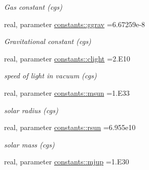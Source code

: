 \begin{DoxyCompactItemize}
\begin{DoxyCompactList}\small\item\em Gas constant (cgs) \end{DoxyCompactList}\item 
\hypertarget{namespaceconstants_a1e2651b5b314d8b869a9a48b1063f126}{}real, parameter \hyperlink{namespaceconstants_a1e2651b5b314d8b869a9a48b1063f126}{constants\+::ggrav} =6.\+67259e-\/8\label{namespaceconstants_a1e2651b5b314d8b869a9a48b1063f126}

\begin{DoxyCompactList}\small\item\em Gravitational constant (cgs) \end{DoxyCompactList}\item 
\hypertarget{namespaceconstants_ac15de49d1114e2e8d78a3e77e2c0ebd0}{}real, parameter \hyperlink{namespaceconstants_ac15de49d1114e2e8d78a3e77e2c0ebd0}{constants\+::clight} =2.\+E10\label{namespaceconstants_ac15de49d1114e2e8d78a3e77e2c0ebd0}

\begin{DoxyCompactList}\small\item\em speed of light in vacuum (cgs) \end{DoxyCompactList}\item 
\hypertarget{namespaceconstants_a47dcdcdf147127ab93252565436ce046}{}real, parameter \hyperlink{namespaceconstants_a47dcdcdf147127ab93252565436ce046}{constants\+::msun} =1.\+E33\label{namespaceconstants_a47dcdcdf147127ab93252565436ce046}

\begin{DoxyCompactList}\small\item\em solar radius (cgs) \end{DoxyCompactList}\item 
\hypertarget{namespaceconstants_a86e80095a8a44315466905ab42ec2814}{}real, parameter \hyperlink{namespaceconstants_a86e80095a8a44315466905ab42ec2814}{constants\+::rsun} =6.\+955e10\label{namespaceconstants_a86e80095a8a44315466905ab42ec2814}

\begin{DoxyCompactList}\small\item\em solar mass (cgs) \end{DoxyCompactList}\item 
\hypertarget{namespaceconstants_a399e5e2bceae23d80dfe33489603dfa5}{}real, parameter \hyperlink{namespaceconstants_a399e5e2bceae23d80dfe33489603dfa5}{constants\+::mjup} =1.\+E30\label{namespaceconstants_a399e5e2bceae23d80dfe33489603dfa5}


\end{DoxyCompactItemize}
